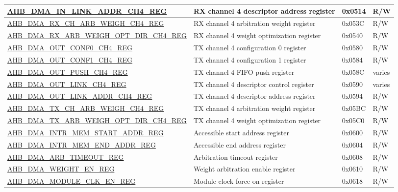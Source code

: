 \begin{longtable}{ | l | p{10cm} | p{1.3cm} | l | }
\hyperref[regdesc:AHBDMAINLINKADDRCHNREG]{AHB\_DMA\_IN\_LINK\_ADDR\_CH4\_REG} & RX channel 4 descriptor address register & 0x0514 & R/W \\ \hline
\hyperref[regdesc:AHBDMARXCHARBWEIGHCHNREG]{AHB\_DMA\_RX\_CH\_ARB\_WEIGH\_CH4\_REG} & RX channel 4 arbitration weight register & 0x053C & R/W \\ \hline
\hyperref[regdesc:AHBDMARXARBWEIGHOPTDIRCHNREG]{AHB\_DMA\_RX\_ARB\_WEIGH\_OPT\_DIR\_CH4\_REG} & RX channel 4 weight optimization register & 0x0540 & R/W \\ \hline
\hyperref[regdesc:AHBDMAOUTCONF0CHNREG]{AHB\_DMA\_OUT\_CONF0\_CH4\_REG} & TX channel 4 configuration 0 register & 0x0580 & R/W \\ \hline
\hyperref[regdesc:AHBDMAOUTCONF1CHNREG]{AHB\_DMA\_OUT\_CONF1\_CH4\_REG} & TX channel 4 configuration 1 register & 0x0584 & R/W \\ \hline
\hyperref[regdesc:AHBDMAOUTPUSHCHNREG]{AHB\_DMA\_OUT\_PUSH\_CH4\_REG} & TX channel 4 FIFO push register & 0x058C & varies \\ \hline
\hyperref[regdesc:AHBDMAOUTLINKCHNREG]{AHB\_DMA\_OUT\_LINK\_CH4\_REG} & TX channel 4 descriptor control register & 0x0590 & varies \\ \hline
\hyperref[regdesc:AHBDMAOUTLINKADDRCHNREG]{AHB\_DMA\_OUT\_LINK\_ADDR\_CH4\_REG} & TX channel 4 descriptor address register & 0x0594 & R/W \\ \hline
\hyperref[regdesc:AHBDMATXCHARBWEIGHCHNREG]{AHB\_DMA\_TX\_CH\_ARB\_WEIGH\_CH4\_REG} & TX channel 4 arbitration weight register & 0x05BC & R/W \\ \hline
\hyperref[regdesc:AHBDMATXARBWEIGHOPTDIRCHNREG]{AHB\_DMA\_TX\_ARB\_WEIGH\_OPT\_DIR\_CH4\_REG} & TX channel 4 weight optimization register & 0x05C0 & R/W \\ \hline
\hyperref[regdesc:AHBDMAINTRMEMSTARTADDRREG]{AHB\_DMA\_INTR\_MEM\_START\_ADDR\_REG} & Accessible start address register & 0x0600 & R/W \\ \hline
\hyperref[regdesc:AHBDMAINTRMEMENDADDRREG]{AHB\_DMA\_INTR\_MEM\_END\_ADDR\_REG} & Accessible end address register & 0x0604 & R/W \\ \hline
\hyperref[regdesc:AHBDMAARBTIMEOUTREG]{AHB\_DMA\_ARB\_TIMEOUT\_REG} & Arbitration timeout register & 0x0608 & R/W \\ \hline
\hyperref[regdesc:AHBDMAWEIGHTENREG]{AHB\_DMA\_WEIGHT\_EN\_REG} & Weight arbitration enable register & 0x0610 & R/W \\ \hline
\hyperref[regdesc:AHBDMAMODULECLKENREG]{AHB\_DMA\_MODULE\_CLK\_EN\_REG} & Module clock force on register & 0x0618 & R/W \\ \hline

\end{longtable}
